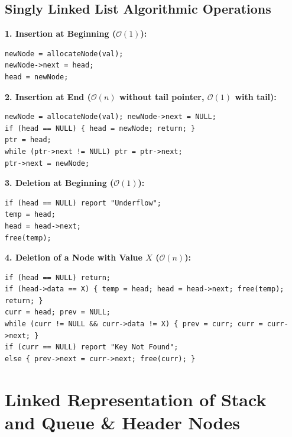 \documentclass[12pt,a4paper]{article}
\begin{document}
\subsection{Singly Linked List Algorithmic Operations}
\begin{tcolorbox}[formulabox, title={\textbf{Algorithms for Insertion and Deletion in SLL}}]
\textbf{1. Insertion at Beginning ($\mathcal{O}(1)$):}
\begin{verbatim}
newNode = allocateNode(val);
newNode->next = head;
head = newNode;
\end{verbatim}

\textbf{2. Insertion at End ($\mathcal{O}(n)$ without tail pointer, $\mathcal{O}(1)$ with tail):}
\begin{verbatim}
newNode = allocateNode(val); newNode->next = NULL;
if (head == NULL) { head = newNode; return; }
ptr = head;
while (ptr->next != NULL) ptr = ptr->next;
ptr->next = newNode;
\end{verbatim}

\textbf{3. Deletion at Beginning ($\mathcal{O}(1)$):}
\begin{verbatim}
if (head == NULL) report "Underflow";
temp = head;
head = head->next;
free(temp);
\end{verbatim}

\textbf{4. Deletion of a Node with Value $X$ ($\mathcal{O}(n)$):}
\begin{verbatim}
if (head == NULL) return;
if (head->data == X) { temp = head; head = head->next; free(temp); return; }
curr = head; prev = NULL;
while (curr != NULL && curr->data != X) { prev = curr; curr = curr->next; }
if (curr == NULL) report "Key Not Found";
else { prev->next = curr->next; free(curr); }
\end{verbatim}
\end{tcolorbox}

\section{Linked Representation of Stack and Queue \& Header Nodes}
\end{document}
